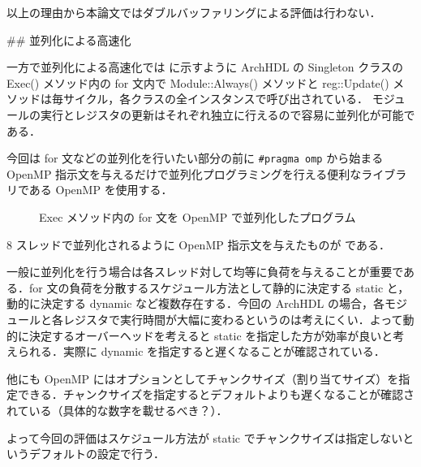 以上の理由から本論文ではダブルバッファリングによる評価は行わない．



## 並列化による高速化 \label{ss:parallel}

一方で並列化による高速化では  に示すように
ArchHDL の Singleton クラスの Exec() メソッド内の
for 文内で Module::Always() メソッドと
reg::Update() メソッドは毎サイクル，各クラスの全インスタンスで呼び出されている．
モジュールの実行とレジスタの更新はそれぞれ独立に行えるので容易に並列化が可能である．

今回は for 文などの並列化を行いたい部分の前に \verb/#pragma omp/ から始まる OpenMP 指示文を与えるだけで並列化プログラミングを行える便利なライブラリである OpenMP \cite{openmp}を使用する．

\begin{figure}[t]
 
 \caption{Exec メソッド内の for 文を OpenMP で並列化したプログラム}
 \label{src:exec_openmp}
\end{figure}

8 スレッドで並列化されるように OpenMP 指示文を与えたものが  である．

一般に並列化を行う場合は各スレッド対して均等に負荷を与えることが重要である．for 文の負荷を分散するスケジュール方法として静的に決定する static と，動的に決定する dynamic など複数存在する．今回の ArchHDL の場合，各モジュールと各レジスタで実行時間が大幅に変わるというのは考えにくい．よって動的に決定するオーバーヘッドを考えると static を指定した方が効率が良いと考えられる．実際に dynamic を指定すると遅くなることが確認されている．

他にも OpenMP にはオプションとしてチャンクサイズ（割り当てサイズ）を指定できる．チャンクサイズを指定するとデフォルトよりも遅くなることが確認されている（具体的な数字を載せるべき？）．

よって今回の評価はスケジュール方法が static でチャンクサイズは指定しないというデフォルトの設定で行う．


